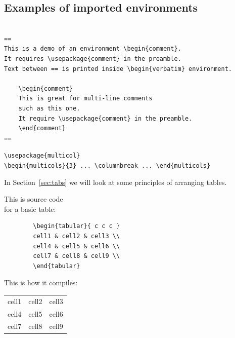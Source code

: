 \documentclass[a4paper,11pt]{article}
\begin{document}
\subsection{Examples of imported environments}


\begin{verbatim}

==
This is a demo of an environment \begin{comment}. 
It requires \usepackage{comment} in the preamble. 
Text between == is printed inside \begin{verbatim} environment.

	\begin{comment}
	This is great for multi-line comments 
	such as this one.
	It require \usepackage{comment} in the preamble.
	\end{comment}
==
\end{verbatim}

\verb|\usepackage{multicol}| \\
\verb|\begin{multicols}{3} ... \columnbreak ... \end{multicols}|

\begin{multicols}{3} %

	 
	In Section~\ref{sec:tabs} we will look at some principles of arranging tables.

	\columnbreak 
	This is source code \\ for a basic table:
	\begin{verbatim}
		\begin{tabular}{ c c c } 
		cell1 & cell2 & cell3 \\ 
		cell4 & cell5 & cell6 \\ 
		cell7 & cell8 & cell9 \\ 
		\end{tabular}
	\end{verbatim}

	\columnbreak
	This is how it compiles:
	\begin{tabular}{ c c c } 
		cell1 & cell2 & cell3 \\
		cell4 & cell5 & cell6 \\ 
		cell7 & cell8 & cell9 \\ 
	\end{tabular}
	\setlength\fboxsep{3pt} %
	\setlength\fboxrule{1pt} %
\end{multicols}
\end{document}
